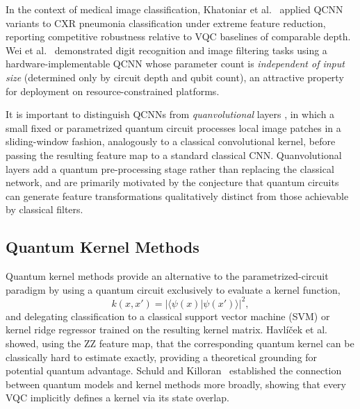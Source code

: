 \documentclass[11pt,a4paper]{article}
\begin{document}
In the context of medical image classification, Khatoniar et
al.~\cite{khatoniar2024} applied QCNN variants to CXR pneumonia classification
under extreme feature reduction, reporting competitive robustness relative to
VQC baselines of comparable depth.  Wei et al.~\cite{wei2022} demonstrated
digit recognition and image filtering tasks using a hardware-implementable QCNN
whose parameter count is \emph{independent of input size} (determined only by
circuit depth and qubit count), an attractive property for deployment on
resource-constrained platforms.

It is important to distinguish QCNNs from \emph{quanvolutional} layers
\cite{henderson2020quanvolutional}, in which a small fixed or parametrized
quantum circuit processes local image patches in a sliding-window fashion,
analogously to a classical convolutional kernel, before passing the resulting
feature map to a standard classical CNN.  Quanvolutional layers add a quantum
pre-processing stage rather than replacing the classical network, and are
primarily motivated by the conjecture that quantum circuits can generate
feature transformations qualitatively distinct from those achievable by
classical filters.

\subsection{Quantum Kernel Methods}
\label{sec:kernels}

Quantum kernel methods provide an alternative to the parametrized-circuit
paradigm by using a quantum circuit exclusively to evaluate a kernel function,
\begin{equation}
  k(x, x') = \lvert \langle \psi(x) \lvert \psi(x') \rangle \rvert^2,
  \label{eq:kernel}
\end{equation}
and delegating classification to a classical support vector machine (SVM) or
kernel ridge regressor trained on the resulting kernel matrix.  Havl\'i\v{c}ek
et al.~\cite{havlicek2019} showed, using the ZZ feature map, that the
corresponding quantum kernel can be classically hard to estimate exactly,
providing a theoretical grounding for potential quantum advantage.  Schuld and
Killoran~\cite{schuld2019kernel} established the connection between quantum
models and kernel methods more broadly, showing that every VQC implicitly
defines a kernel via its state overlap.
\end{document}

